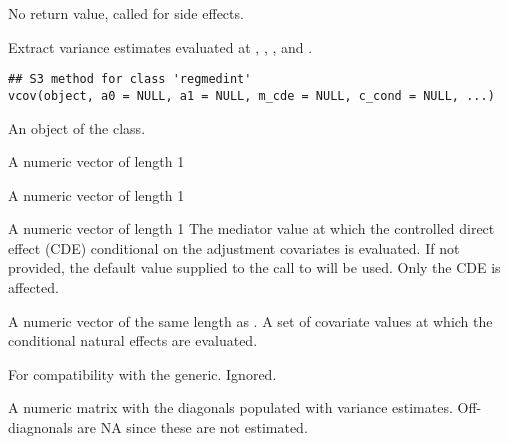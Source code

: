 \documentclass[a4paper]{book}
\begin{document}
%
\begin{Value}
No return value, called for side effects.
\end{Value}
%
\begin{Description}
Extract variance estimates evaluated at , , , and .
\end{Description}
%
\begin{Usage}
\begin{verbatim}
## S3 method for class 'regmedint'
vcov(object, a0 = NULL, a1 = NULL, m_cde = NULL, c_cond = NULL, ...)
\end{verbatim}
\end{Usage}
%
\begin{Arguments}
\begin{ldescription}
\item[\code{object}] An object of the  class.

\item[\code{a0}] A numeric vector of length 1

\item[\code{a1}] A numeric vector of length 1

\item[\code{m\_cde}] A numeric vector of length 1 The mediator value at which the controlled direct effect (CDE) conditional on the adjustment covariates is evaluated. If not provided, the default value supplied to the call to  will be used. Only the CDE is affected.

\item[\code{c\_cond}] A numeric vector of the same length as . A set of covariate values at which the conditional natural effects are evaluated.

\item[\code{...}] For compatibility with the generic. Ignored.
\end{ldescription}
\end{Arguments}
%
\begin{Value}
A numeric matrix with the diagonals populated with variance estimates. Off-diagnonals are NA since these are not estimated.
\end{Value}
%
\end{document}
